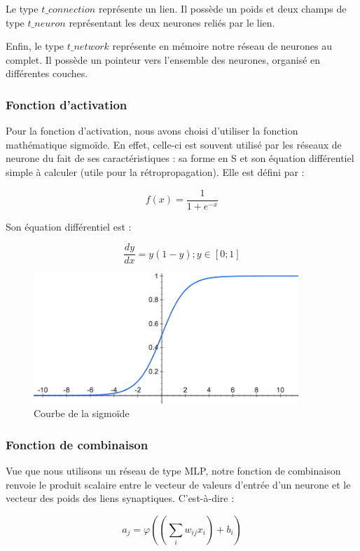 \documentclass[11pt]{report}
\begin{document}
Le type $t\_connection$ représente un lien. Il possède un poids et deux champs de type $t\_neuron$ représentant les deux neurones reliés par le lien.

Enfin, le type $t\_network$ représente en mémoire notre réseau de neurones au complet. Il possède un pointeur vers l'ensemble des neurones, organisé en différentes couches.

\bigskip


\subsubsection{Fonction d'activation}

Pour la fonction d'activation, nous avons choisi d'utiliser la fonction mathématique sigmoïde. En effet, celle-ci est souvent utilisé par les réseaux de neurone du fait de ses caractéristiques : sa forme en S et son équation différentiel simple à calculer (utile pour la rétropropagation). Elle est défini par :

\[ f\left( x\right) = \dfrac{1}{1+e^{-x}} \]

Son équation différentiel est :

\[ \dfrac{dy}{dx} = y\left(1-y\right) ; y \in [0; 1] \]

\begin{figure}[htbp]
\centering
\includegraphics[width=10cm]{sigmoide.png}
\caption{Courbe de la sigmoïde}
\end{figure}

\subsubsection{Fonction de combinaison}

Vue que nous utilisons un réseau de type MLP, notre fonction de combinaison renvoie le produit scalaire entre le vecteur de valeurs d'entrée d'un neurone et le vecteur des poids des liens synaptiques. C'est-à-dire :

\[ a_{j} = \varphi \left( \left( \sum_{i} w_{ij} x_{i} \right) + b_{i} \right) \]
\end{document}

